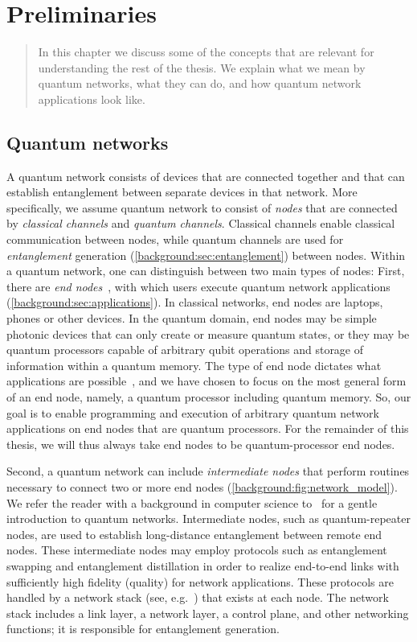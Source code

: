 \chapter
 [Preliminaries]
 {Preliminaries}
\label{chp:background}


\begin{abstract}
    In this chapter we discuss some of the concepts that are relevant for understanding the rest of the thesis.
    We explain what we mean by quantum networks, what they can do, and how quantum network applications look like.
\end{abstract}

\section{Quantum networks}

A quantum network consists of devices that are connected together and that can establish entanglement between separate devices in that network.
More specifically, we assume quantum network to consist of \textit{nodes} that are connected by \textit{classical channels} and \textit{quantum channels}.
Classical channels enable classical communication between nodes, while quantum channels are used for \textit{entanglement} generation (\cref{background:sec:entanglement}) between nodes.
Within a quantum network, one can distinguish between two main types of nodes: First, there are \emph{end nodes}~\cite{wehner_2018_stages}, with which users execute quantum network applications (\cref{background:sec:applications}).
In classical networks, end nodes are laptops, phones or other devices.
In the quantum domain, end nodes may be simple photonic devices that can only create or measure quantum states, or they may be quantum processors capable of arbitrary qubit operations and storage of information within a quantum memory.
The type of end node dictates what applications are possible~\cite{wehner_2018_stages}, and we have chosen to focus on the most general form of an end node, namely, a quantum processor including quantum memory.
So, our goal is to enable programming and execution of arbitrary quantum network applications on end nodes that are quantum processors.
For the remainder of this thesis, we will thus always take end nodes to be quantum-processor end nodes.

Second, a quantum network can include \emph{intermediate nodes} that perform routines necessary to connect two or more end nodes (\cref{background:fig:network_model}).
We refer the reader with a background in computer science to~\cite{vanMeter_book} for a gentle introduction to quantum networks. 
Intermediate nodes, such as quantum-repeater nodes, are used to establish long-distance entanglement between remote end nodes.
These intermediate nodes may employ protocols such as entanglement swapping and entanglement distillation in order to realize end-to-end links with sufficiently high fidelity (quality) for network applications.
These protocols are handled by a network stack (see, e.g.~\cite{dahlberg_2019_egp}) that exists at each node.
The network stack includes a link layer, a network layer, a control plane, and other networking functions; it is responsible for entanglement generation.

